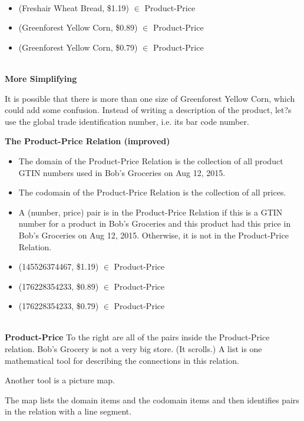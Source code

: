 \documentclass{ximera}
\begin{document}
\quad \\



\begin{example}
\begin{itemize}
\item (Freshair Wheat Bread, \$1.19) $\in$ Product-Price
\item (Greenforest Yellow Corn, \$0.89) $\in$ Product-Price
\item (Greenforest Yellow Corn, \$0.79) $\in$ Product-Price
 \end{itemize}
 \end{example}


\quad \\




\textbf{More Simplifying} 

It is possible that there is more than one size of Greenforest Yellow Corn, which could add some confusion.  Instead of writing a description of the product, let?s use the global trade identification number, i.e. its bar code number.


\begin{definition}
\textbf{The Product-Price Relation (improved)}
\begin{itemize}
\item The domain of the Product-Price Relation is the collection of all product GTIN numbers used in Bob's Groceries on Aug 12, 2015. 
\item The codomain of the Product-Price Relation is the collection of all prices. 
\item A (number, price) pair is in the Product-Price Relation if this is a GTIN number for a product in Bob's Groceries and this product had this price in Bob's Groceries on Aug 12, 2015. Otherwise, it is not in the Product-Price Relation.
\end{itemize}
\end{definition}



\begin{example}
\begin{itemize}
\item (145526374467, \$1.19) $\in$ Product-Price
\item (176228354233, \$0.89) $\in$ Product-Price
\item (176228354233, \$0.79) $\in$ Product-Price
 \end{itemize}
 \end{example}

\quad \\

\textbf{Product-Price}
To the right are all of the pairs inside the Product-Price relation.  Bob's Grocery is not a very big store. (It scrolls.)
A list is one mathematical tool for describing the connections in this relation.




Another tool is a picture map.

The map lists the domain items and the codomain items and then identifies pairs in the relation with a line segment.
\end{document}
